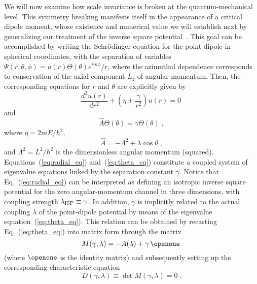 \documentclass[a4paper,twocolumn,
showpacs,amssymb,aps,prl,superscriptaddress]{revtex4}%
\begin{document}
We will now examine how scale invariance is broken at the
quantum-mechanical level. This symmetry breaking manifests itself
in the appearance of a critical dipole moment, whose existence
and numerical value we will establish next by generalizing our
treatment of the inverse square potential~\cite{cam:00}. This goal can
be accomplished by writing the Schr\"{o}dinger equation for the point
dipole in spherical coordinates, with the separation of variables
 $\Psi (r,\theta, \phi)= u(r) \Theta (\theta) e^{im\phi}/r$,
where the azimuthal dependence corresponds to conservation of the
axial component $L_{z}$ of angular momentum. Then, the
corresponding equations for $r$ and $\theta$ are explicitly given
by
\begin{equation}
\frac{d^{2}  u(r)}{dr^{2}} + \left( \eta + \frac{\gamma}{r^{2}}
\right) u(r) = 0 \;
\label{eq:radial_eq}
\end{equation} 
and
\begin{equation}
\hat{A} \Theta (\theta) = \gamma \Theta (\theta) \; ,
\label{eq:theta_eq}
\end{equation}
where $\eta=2mE/\hbar^{2}$,
\begin{equation}
\hat{A} = - \Lambda^{2} + \lambda \cos \theta
 \; ,
\label{eq:angular_operator} 
\end{equation}
and
  $\Lambda^{2} =
L^{2} /\hbar^{2}$ is the dimensionless angular momentum (squared).
Equations~(\ref{eq:radial_eq}) and~(\ref{eq:theta_eq}) constitute
a coupled system of eigenvalue equations linked by the separation
constant $\gamma$. Notice that Eq.~(\ref{eq:radial_eq}) can be
interpreted as defining an isotropic inverse square potential for
the zero angular-momentum channel in three dimensions, with
coupling strength $ \lambda_{\rm ISP} \equiv \gamma$. In addition,
$\gamma$ is implicitly related to the actual coupling $\lambda$ of
the point-dipole potential by means of the eigenvalue
equation~(\ref{eq:theta_eq}). This relation can be obtained by
recasting Eq.~(\ref{eq:theta_eq}) into matrix form through the
matrix
\begin{equation}
M(\gamma, \lambda) = - A(\lambda) + \gamma  \, \openone \; 
\end{equation}
(where $\openone$ is the identity matrix)
and subsequently setting up
the corresponding characteristic 
equation~\cite{lev:67,bro:67,cra:67}
\begin{equation}
D(\gamma, \lambda) \equiv \det M (\gamma,\lambda) 
= 0 
\; .
 \label{eq:determinant}
\end{equation}
\end{document}
